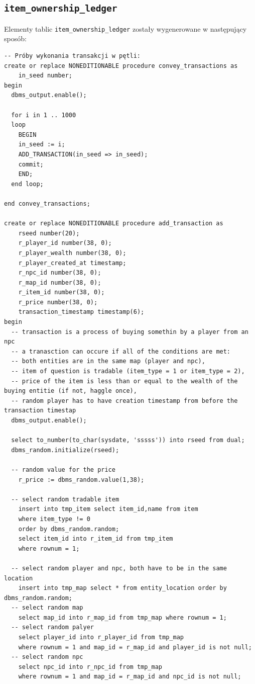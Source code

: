 \documentclass[11pt]{article}
\begin{document}
\subsection{\texttt{item\_ownership\_ledger}}
\label{sec:org340c0bf}
Elementy tablic \texttt{item\_ownership\_ledger} zostały wygenerowane w następujący sposób:
\begin{verbatim}
-- Próby wykonania transakcji w pętli:
create or replace NONEDITIONABLE procedure convey_transactions as
    in_seed number;
begin
  dbms_output.enable();

  for i in 1 .. 1000
  loop
    BEGIN
	in_seed := i;
	ADD_TRANSACTION(in_seed => in_seed);
	commit;
    END;
  end loop;

end convey_transactions;

create or replace NONEDITIONABLE procedure add_transaction as
    rseed number(20);
    r_player_id number(38, 0);
    r_player_wealth number(38, 0);
    r_player_created_at timestamp;
    r_npc_id number(38, 0);
    r_map_id number(38, 0);
    r_item_id number(38, 0);
    r_price number(38, 0);
    transaction_timestamp timestamp(6);
begin
  -- transaction is a process of buying somethin by a player from an npc
  -- a tranasction can occure if all of the conditions are met:
  -- both entities are in the same map (player and npc),
  -- item of question is tradable (item_type = 1 or item_type = 2),
  -- price of the item is less than or equal to the wealth of the buying entitie (if not, haggle once),
  -- random player has to have creation timestamp from before the transaction timestap
  dbms_output.enable();

  select to_number(to_char(sysdate, 'sssss')) into rseed from dual;
  dbms_random.initialize(rseed);

  -- random value for the price
    r_price := dbms_random.value(1,38);

  -- select random tradable item
    insert into tmp_item select item_id,name from item
    where item_type != 0
    order by dbms_random.random;
    select item_id into r_item_id from tmp_item
    where rownum = 1;

  -- select random player and npc, both have to be in the same location
    insert into tmp_map select * from entity_location order by dbms_random.random;
  -- select random map
    select map_id into r_map_id from tmp_map where rownum = 1;
  -- select random palyer
    select player_id into r_player_id from tmp_map
    where rownum = 1 and map_id = r_map_id and player_id is not null;
  -- select random npc
    select npc_id into r_npc_id from tmp_map
    where rownum = 1 and map_id = r_map_id and npc_id is not null;


\end{verbatim}
\end{document}
